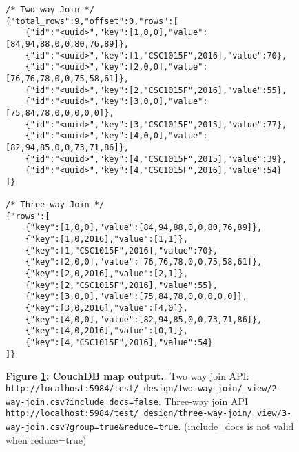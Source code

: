\begin{figure}[H]
    \centering
    \begin{mdframed}[rightline=false,leftline=false]
        \begin{verbatim}
/* Two-way Join */
{"total_rows":9,"offset":0,"rows":[
    {"id":"<uuid>","key":[1,0,0],"value":[84,94,88,0,0,80,76,89]},
    {"id":"<uuid>","key":[1,"CSC1015F",2016],"value":70},
    {"id":"<uuid>","key":[2,0,0],"value":[76,76,78,0,0,75,58,61]},
    {"id":"<uuid>","key":[2,"CSC1015F",2016],"value":55},
    {"id":"<uuid>","key":[3,0,0],"value":[75,84,78,0,0,0,0,0]},
    {"id":"<uuid>","key":[3,"CSC1015F",2015],"value":77},
    {"id":"<uuid>","key":[4,0,0],"value":[82,94,85,0,0,73,71,86]},
    {"id":"<uuid>","key":[4,"CSC1015F",2015],"value":39},
    {"id":"<uuid>","key":[4,"CSC1015F",2016],"value":54}
]}

/* Three-way Join */
{"rows":[
    {"key":[1,0,0],"value":[84,94,88,0,0,80,76,89]},
    {"key":[1,0,2016],"value":[1,1]},
    {"key":[1,"CSC1015F",2016],"value":70},
    {"key":[2,0,0],"value":[76,76,78,0,0,75,58,61]},
    {"key":[2,0,2016],"value":[2,1]},
    {"key":[2,"CSC1015F",2016],"value":55},
    {"key":[3,0,0],"value":[75,84,78,0,0,0,0,0]},
    {"key":[3,0,2016],"value":[4,0]},
    {"key":[4,0,0],"value":[82,94,85,0,0,73,71,86]},
    {"key":[4,0,2016],"value":[0,1]},
    {"key":[4,"CSC1015F",2016],"value":54}
]}
        \end{verbatim}
    \end{mdframed}
    \caption[CouchDB map output]{\textbf{Figure \ref{fig-test-map-output}: CouchDB map output.}. Two way join API: \texttt{http://localhost:5984/test/\_design/two-way-join/\_view/2-way-join.csv?include\_docs=false}. Three-way join API \texttt{http://localhost:5984/test/\_design/three-way-join/\_view/3-way-join.csv?group=true\&reduce=true}. (include\_docs is not valid when reduce=true)}
    \label{fig-test-map-output}
\end{figure}
